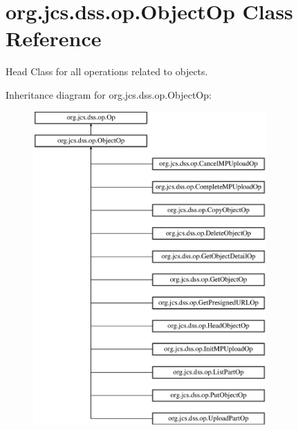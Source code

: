 \hypertarget{classorg_1_1jcs_1_1dss_1_1op_1_1ObjectOp}{}\section{org.\+jcs.\+dss.\+op.\+Object\+Op Class Reference}
\label{classorg_1_1jcs_1_1dss_1_1op_1_1ObjectOp}


Head Class for all operations related to objects.  


Inheritance diagram for org.\+jcs.\+dss.\+op.\+Object\+Op\+:\begin{figure}[H]
\begin{center}
\leavevmode
\includegraphics[height=12.000000cm]{classorg_1_1jcs_1_1dss_1_1op_1_1ObjectOp}
\end{center}
\end{figure}
